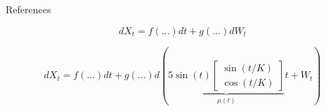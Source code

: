\documentclass[
    aspectratio=169,
    10pt,
]{beamer}
\begin{document}
\begin{frame}{References}

\nocite{*}
\printbibliography
    
\end{frame}


\begin{frame}
\Huge
\[  
    dX_t = f(...) dt + g(...) dW_t
\]
    
\end{frame}
\begin{frame}
\LARGE
\[  
    dX_t = f(...) dt + g(...) d\left(
        \underbrace{5\sin(t)\begin{bmatrix}
            \sin(t / K) \\
            \cos(t / K)
        \end{bmatrix}}_{\mu(t)} t + W_t
    \right)
\]
    
\end{frame}
\end{document}
